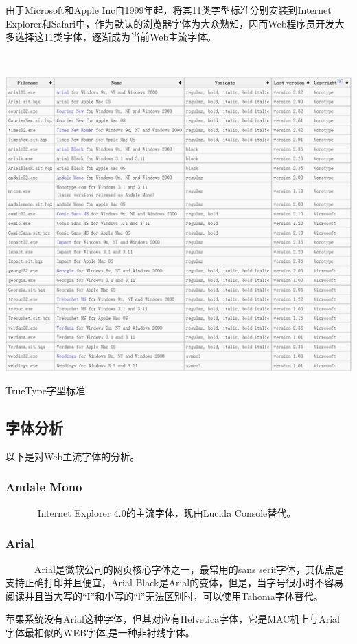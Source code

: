 \documentclass[a4paper]{article}
\begin{document}
由于Microsoft和Apple Inc自1999年起，将其11类字型标准分别安装到Internet Explorer和Safari中，作为默认的浏览器字体为大众熟知，因而Web程序员开发大多选择这11类字体，逐渐成为当前Web主流字体。

~~

\makeatletter
\def\@captype{figure}
\makeatother
\centerline{\includegraphics [width=1.3\textwidth]{cyt1.png} }
\caption{TrueType字型标准}
\label{cyt1}

\subsection{字体分析}

以下是对Web主流字体的分析。

	\subsubsection{Andale Mono} 	
~~~~~~	Internet Explorer 4.0的主流字体，现由Lucida Console替代。

	\subsubsection{Arial} 
	
~~~~~~Arial是微软公司的网页核心字体之一，最常用的sans serif字体，其优点是支持正确打印并且便宜，Arial Black是Arial的变体，但是，当字号很小时不容易阅读并且当大写的“I”和小写的“l”无法区别时，可以使用Tahoma字体替代。
	
苹果系统没有Arial这种字体，但其对应有Helvetica字体，它是MAC机上与Arial 字体最相似的WEB字体,是一种非衬线字体\cite{cyt6}。
	
\end{document}
